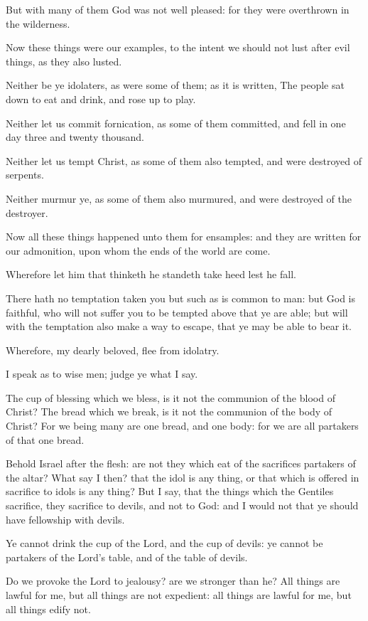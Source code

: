 \verse But with many of them God was not well pleased: for they were overthrown in the wilderness.

\verse Now these things were our examples, to the intent we should not lust after evil things, as they also lusted.

\verse Neither be ye idolaters, as were some of them; as it is written, The people sat down to eat and drink, and rose up to play.

\verse Neither let us commit fornication, as some of them committed, and fell in one day three and twenty thousand.

\verse Neither let us tempt Christ, as some of them also tempted, and were destroyed of serpents.

\verse Neither murmur ye, as some of them also murmured, and were destroyed of the destroyer.

\verse Now all these things happened unto them for ensamples: and they are written for our admonition, upon whom the ends of the world are come.

\verse Wherefore let him that thinketh he standeth take heed lest he fall.

\verse There hath no temptation taken you but such as is common to man: but God is faithful, who will not suffer you to be tempted above that ye are able; but will with the temptation also make a way to escape, that ye may be able to bear it.

\verse Wherefore, my dearly beloved, flee from idolatry.

\verse I speak as to wise men; judge ye what I say.

\verse The cup of blessing which we bless, is it not the communion of the blood of Christ? The bread which we break, is it not the communion of the body of Christ?  \verse For we being many are one bread, and one body: for we are all partakers of that one bread.

\verse Behold Israel after the flesh: are not they which eat of the sacrifices partakers of the altar?  \verse What say I then? that the idol is any thing, or that which is offered in sacrifice to idols is any thing?  \verse But I say, that the things which the Gentiles sacrifice, they sacrifice to devils, and not to God: and I would not that ye should have fellowship with devils.

\verse Ye cannot drink the cup of the Lord, and the cup of devils: ye cannot be partakers of the Lord's table, and of the table of devils.

\verse Do we provoke the Lord to jealousy? are we stronger than he?  \verse All things are lawful for me, but all things are not expedient: all things are lawful for me, but all things edify not.

